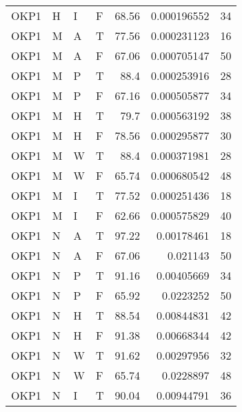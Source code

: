 \begin{longtable}{llllrrr}
    OKP1     & H         & I         & F          & 68.56      & 0.000196552 & 34       \\
    OKP1     & M         & A         & T          & 77.56      & 0.000231123 & 16       \\
    OKP1     & M         & A         & F          & 67.06      & 0.000705147 & 50       \\
    OKP1     & M         & P         & T          & 88.4       & 0.000253916 & 28       \\
    OKP1     & M         & P         & F          & 67.16      & 0.000505877 & 34       \\
    OKP1     & M         & H         & T          & 79.7       & 0.000563192 & 38       \\
    OKP1     & M         & H         & F          & 78.56      & 0.000295877 & 30       \\
    OKP1     & M         & W         & T          & 88.4       & 0.000371981 & 28       \\
    OKP1     & M         & W         & F          & 65.74      & 0.000680542 & 48       \\
    OKP1     & M         & I         & T          & 77.52      & 0.000251436 & 18       \\
    OKP1     & M         & I         & F          & 62.66      & 0.000575829 & 40       \\
    OKP1     & N         & A         & T          & 97.22      & 0.00178461  & 18       \\
    OKP1     & N         & A         & F          & 67.06      & 0.021143    & 50       \\
    OKP1     & N         & P         & T          & 91.16      & 0.00405669  & 34       \\
    OKP1     & N         & P         & F          & 65.92      & 0.0223252   & 50       \\
    OKP1     & N         & H         & T          & 88.54      & 0.00844831  & 42       \\
    OKP1     & N         & H         & F          & 91.38      & 0.00668344  & 42       \\
    OKP1     & N         & W         & T          & 91.62      & 0.00297956  & 32       \\
    OKP1     & N         & W         & F          & 65.74      & 0.0228897   & 48       \\
    OKP1     & N         & I         & T          & 90.04      & 0.00944791  & 36       \\

\end{longtable}
